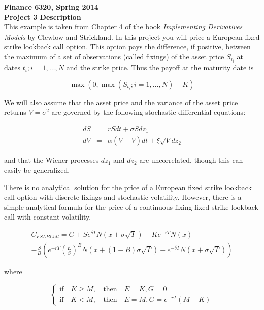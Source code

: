 \documentclass[11pt]{article}
\begin{document}
\pagestyle{empty}

\textbf{Finance 6320, Spring 2014} \\
\textbf{Project 3 Description}     \\

\bigskip
This example is taken from Chapter 4 of the book \textit{Implementing Derivatives Models} by Clewlow 
and Strickland. In this project you will price a European fixed strike lookback call option. This 
option pays the difference, if positive, between the maximum of a set of observations (called fixings)
of the asset price $S_{t_{i}}$ at dates $t_{i}; i = 1, \ldots, N$ and the strike price. Thus the
payoff at the maturity date is 

\medskip
\begin{equation*}
\max{(0, \max{(S_{t_{i}}; i = 1, \ldots, N)} - K)}
\end{equation*}

\bigskip
We will also assume that the asset price and the variance of the asset price returns $V = \sigma^{2}$
are governed by the following stochastic differential equations:

\medskip
\begin{eqnarray*}
dS &=& r S dt + \sigma S dz_{1} \\
dV &=& \alpha (\bar{V} - V) dt + \xi \sqrt{V} dz_{2}
\end{eqnarray*}

\medskip
and that the Wiener processes $dz_{1}$ and $dz_{2}$ are uncorrelated, though this can easily be
generalized. 

\bigskip
There is no analytical solution for the price of a European fixed strike lookback call option
with discrete fixings and stochastic volatility. However, there is a simple analytical formula
for the price of a continuous fixing fixed strike lookback call with constant volatility.

\begin{multline*}
C_{FSLBCall} = G + Se^{\delta T} N(x + \sigma \sqrt{T}) - Ke^{-rT}N(x) \\
                                  -\frac{S}{B} \left( e^{-rT} \left(\frac{E}{S} \right)^{B} N(x + (1 - B) \sigma \sqrt{T}) 
                                 -e^{-\delta T} N(x + \sigma \sqrt{T}) \right)
\end{multline*}    

\newpage
where

\medskip
\begin{equation*}
\begin{cases} \mbox{if} \quad K \ge M, & \, \mbox{then} \quad E = K, G = 0 \\
              \mbox{if} \quad K <   M, & \, \mbox{then} \quad E = M, G = e^{-rT}(M - K) \end{cases}
\end{equation*}
\end{document}
